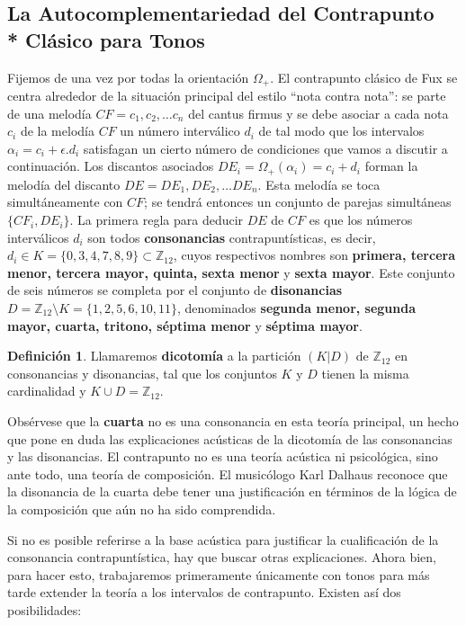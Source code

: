 \documentclass[letterpaper,12pt]{book}
\theoremstyle{definition} \newtheorem{Def}{Definición}[chapter]
\theoremstyle{definition} \newtheorem{Teo}{Teorema}[chapter]
\theoremstyle{definition} \newtheorem{Pro}{Proposición}[chapter]
\theoremstyle{definition} \newtheorem{Lema}{Lema}[chapter]
\begin{document}
\subsection[La Autocomplementariedad para Tonos]{La Autocomplementariedad del Contrapunto \\* Clásico para Tonos} \label{AC}

Fijemos de una vez por todas la orientación $ \Omega_+$. El contrapunto clásico de Fux se centra alrededor de la situación principal del estilo ``nota contra nota'': se parte de una melodía $CF=c_1,c_2,\ldots c_n$ del cantus firmus y se debe asociar a cada nota $c_i$ de la melodía $CF$ un número interválico $d_i$ de tal modo que los intervalos $\alpha_i=c_i+\epsilon.d_i$ satisfagan un cierto número de condiciones que vamos a discutir a continuación. Los discantos asociados $DE_i=\Omega_+(\alpha_i)=c_i+d_i$ forman la melodía del discanto $DE=DE_1,DE_2,\ldots DE_n$. Esta melodía se toca simultáneamente con $CF$; se tendrá entonces un conjunto de parejas simultáneas $\{CF_i,DE_i\}$.
La primera regla para deducir $DE$ de $CF$ es que los números interválicos $d_i$ son todos \textbf{consonancias} contrapuntísticas, es decir, $d_i \in K=\{0,3,4,7,8,9\} \subset \mathbb{Z}_{12}$, cuyos respectivos nombres son \textbf{primera, tercera menor, tercera mayor, quinta, sexta menor} y \textbf{sexta mayor}. Este conjunto de seis números se completa por el conjunto de \textbf{disonancias} $D=\mathbb{Z}_{12}\setminus K=\{1,2,5,6,10,11\}$, denominados \textbf{segunda menor, segunda mayor, cuarta, tritono, séptima menor} y \textbf{séptima mayor}. 

\begin{Def}
Llamaremos \textbf{dicotomía} a la partición $(K|D)$ de $\mathbb{Z}_{12}$ en consonancias y disonancias, tal que los conjuntos $K$ y $D$ tienen la misma cardinalidad y $K \cup D=\mathbb{Z}_{12}$.
\end{Def}

Obsérvese que la \textbf{cuarta} no es una consonancia en esta teoría principal, un hecho que pone en duda las explicaciones acústicas de la dicotomía de las consonancias y las disonancias. El contrapunto no es una teoría acústica ni psicológica, sino ante todo, una teoría de composición. El musicólogo Karl Dalhaus \cite{Dalhaus} reconoce que la disonancia de la cuarta debe tener una justificación en términos de la lógica de la composición que aún no ha sido comprendida.

Si no es posible referirse a la base acústica para justificar la cualificación de la consonancia contrapuntística, hay que buscar otras explicaciones. Ahora bien, para hacer esto, trabajaremos primeramente únicamente con tonos para más tarde extender la teoría a los intervalos de contrapunto. Existen así dos posibilidades:
 
\end{document}
